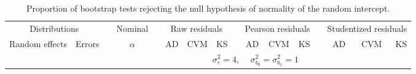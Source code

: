 \begin{table}[ht]
\begin{scriptsize}
\begin{tabular}{ll p{.1cm} c p{.1cm} rrr p{.1cm} rrr p{.1cm} rrr}
   \hline
\end{tabular}
\end{scriptsize}
\end{table}



\begin{table}[ht]
\centering
\caption{\label{tab:bootb0} Proportion of bootstrap tests rejecting the null hypothesis of normality of the random intercept.}
\begin{scriptsize}
\begin{tabular}{ll p{.1cm} c p{.1cm} rrr p{.1cm} rrr p{.1cm} rrr}
  \hline
  \multicolumn{2}{c}{Distributions}& & Nominal & &  \multicolumn{3}{c}{Raw residuals} & & \multicolumn{3}{c}{Pearson residuals} & & \multicolumn{3}{c}{Studentized residuals}\\ \cline{1-2} \cline{6-8} \cline{10-12} \cline{14-16}
  Random effects & Errors & & $\alpha$ & & AD & CVM & KS & & AD & CVM & KS & & AD & CVM & KS \\ 
   \hline
& && && \multicolumn{9}{c}{$\sigma_{\varepsilon}^2 = 4$, \ \ $\sigma_{b_0}^2 = \sigma_{b_1}^2 = 1$} \\ \cline{6-16}


\end{tabular}
\end{scriptsize}
\end{table}
